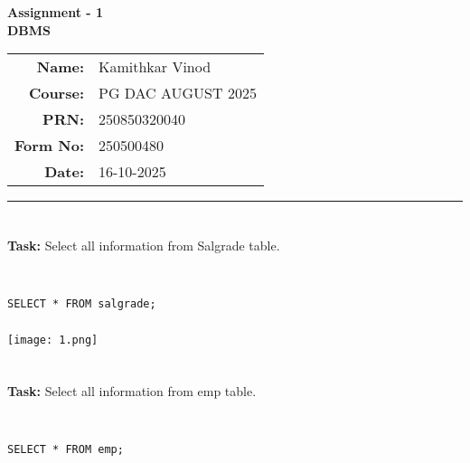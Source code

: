 \documentclass[12pt,a4paper]{article}
\begin{document}
\begin{center}
    \LARGE \textbf{Assignment - 1} \\[0.5cm]
    \Large \textbf{DBMS} \\[1cm]

    \begin{tabular}{rl}
        \textbf{Name:} & Kamithkar Vinod \\
        \textbf{Course:} & PG DAC AUGUST 2025 \\
        \textbf{PRN:} & 250850320040 \\
        \textbf{Form No:} & 250500480 \\
        \textbf{Date:} & 16-10-2025 \\
    \end{tabular}
\end{center}

\vspace{1cm}
\hrule
\vspace{0.5cm}

\section{}
\textbf{Task:} Select all information from Salgrade table.

\subsection{}
\begin{lstlisting}

SELECT * FROM salgrade;

\end{lstlisting}

\subsubsection{}
\begin{center}
    \texttt{[image: 1.png]}
\end{center}



\section{}
\textbf{Task:} Select all information from emp table.

\subsection{}
\begin{lstlisting}

SELECT * FROM emp;

\end{lstlisting}
\end{document}
